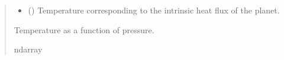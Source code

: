 \documentclass[letterpaper,10pt,english]{sphinxmanual}
\begin{document}
\begin{fulllineitems}
\begin{quote}
\begin{description}
\begin{itemize}
\item {} 
\sphinxAtStartPar
{} () \textendash{} Temperature corresponding to the intrinsic heat flux of the planet.

\end{itemize}

\sphinxAtStartPar
{} \textendash{} Temperature as a function of pressure.

\sphinxAtStartPar
ndarray

\end{description}\end{quote}

\end{fulllineitems}

\end{document}
